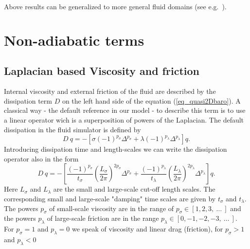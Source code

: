 Above results can be generalized to more general fluid domains 
(see e.g.\ \cite{salmonandtalley1989}).


     


%
\section{Non-adiabatic terms}
%
\subsection{Laplacian based Viscosity and friction}

Internal viscosity and external friction of the fluid are described by 
the dissipation term $D$ on the left hand side of the equation 
(\ref{eq_quasi2Dbaro}). A classical way - the default reference in our
 model - to describe this term is to use a linear operator wich is a
superposition of powers of the Laplacian. 
The default dissipation in the fluid simulator is defined by
\begin{equation} \label{eq_Laplace_dissip}
  D \ q = - \left[\sigma \left(-1 \right)^{p_{\sigma}} \Delta^{p_{\sigma}}
                     +
                  \lambda \left(-1 \right)^{p_{\lambda}} \Delta^{p_{\lambda}}
            \right] q.
\end{equation}
Introducing dissipation time and length-scales we can write the 
dissipation operator also in the form 
\begin{equation} \label{eq_Laplace_dissip_02}
  D \ q = - \left[ 
              \frac{\left(-1 \right)^{p_{\sigma}}}{t_{\sigma}} 
              \left( 
               \frac{L_{\sigma}}{2 \pi}
              \right)^{2 p_{\sigma}}
              \Delta^{p_{\sigma}}
               +
              \frac{\left(-1 \right)^{p_{\lambda}}}{t_{\lambda}} 
              \left( 
                \frac{L_{\lambda}}{2 \pi}
              \right)^{2 p_{\lambda}}
              \Delta^{p_{\lambda}}
            \right] q.
\end{equation}
Here $L_{\sigma}$ and $L_{\lambda}$ are the small and 
large-scale cut-off length scales. The corresponding small and 
large-scale "damping" time scales are given by $t_{\sigma}$ 
and $t_{\lambda}$. The powers $p_{\sigma}$ of small-scale 
viscosity are in the range of $p_{\sigma} \in [1,2,3, \ \dots \ ]$ 
and the powers $p_{\lambda}$ of large-scale friction are in the 
range $p_{\lambda} \in [0,-1,-2,-3, \ \dots \ ]$. 
For $p_{\sigma} = 1$ and $p_{\lambda} = 0$ we speak of viscosity
and linear drag (friction), for $p_{\sigma} > 1$ and $p_{\lambda} < 0$
